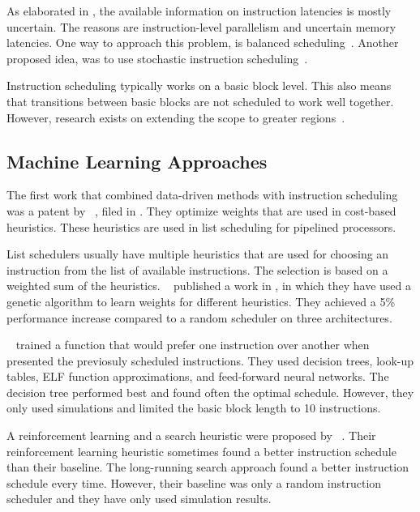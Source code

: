 As elaborated in , the available information on instruction latencies is mostly uncertain.
The reasons are instruction-level parallelism and uncertain memory latencies.
One way to approach this problem, is balanced scheduling~\cite{kerns1993balanced,lo1995improving}.
Another proposed idea, was to use stochastic instruction scheduling~\cite{schielke2000stochastic}.

Instruction scheduling typically works on a basic block level.
This also means that transitions between basic blocks are not scheduled to work well together.
However, research exists on extending the scope to greater regions~\cite{fisher1981trace,bernstein1991global,hwu1993superblock}.

\subsection{Machine Learning Approaches}
The first work that combined data-driven methods with instruction scheduling was a patent by \citeauthor{tarsy1994method}~\cite{tarsy1994method}, filed in \citeyear{tarsy1994method}.
They optimize weights that are used in cost-based heuristics.
These heuristics are used in list scheduling for pipelined processors.

List schedulers usually have multiple heuristics that are used for choosing an instruction from the list of available instructions.
The selection is based on a weighted sum of the heuristics.
\citeauthor{beaty1996using}~\cite{beaty1996using} published a work in \citeyear{beaty1996using}, in which they have used a genetic algorithm to learn weights for different heuristics.
They achieved a 5\% performance increase compared to a random scheduler on three architectures.

\citeauthor{moss1997learning}~\cite{moss1997learning} trained a function that would prefer one instruction over another when presented the previosuly scheduled instructions.
They used decision trees, look-up tables, ELF function approximations, and feed-forward neural networks.
The decision tree performed best and found often the optimal schedule.
However, they only used simulations and limited the basic block length to 10 instructions.

A reinforcement learning and a search heuristic were proposed by \citeauthor{mcgovern1999scheduling}~\cite{mcgovern1999scheduling,mcgovern2002building}.
Their reinforcement learning heuristic sometimes found a better instruction schedule than their baseline.
The long-running search approach found a better instruction schedule every time.
However, their baseline was only a random instruction scheduler and they have only used simulation results.

